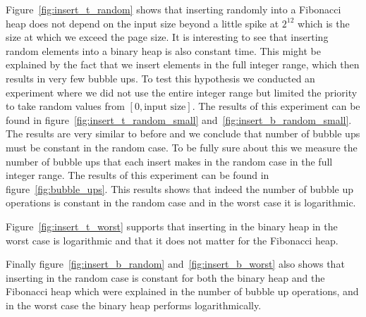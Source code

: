 \documentclass[a4paper,oneside,article,11pt]{memoir}
\begin{document}
Figure~\ref{fig:insert_t_random} shows that inserting randomly into a Fibonacci heap does not depend on the input size beyond a little spike at $2^{12}$ which is the size at which we exceed the page size. It is interesting to see that inserting random elements into a binary heap is also constant time. This might be explained by the fact that we insert elements in the full integer range, which then results in very few bubble ups. To test this hypothesis we conducted an experiment where we did not use the entire integer range but limited the priority to take random values from $\left[ 0, \text{input size} \right]$. The results of this experiment can be found in figure~\ref{fig:insert_t_random_small} and~\ref{fig:insert_b_random_small}. The results are very similar to before and we conclude that number of bubble ups must be constant in the random case. To be fully sure about this we measure the number of bubble ups that each insert makes in the random case in the full integer range. The results of this experiment can be found in figure~\ref{fig:bubble_ups}. This results shows that indeed the number of bubble up operations is constant in the random case and in the worst case it is logarithmic.

Figure~\ref{fig:insert_t_worst} supports that inserting in the binary heap in the worst case is logarithmic and that it does not matter for the Fibonacci heap.

Finally figure~\ref{fig:insert_b_random} and~\ref{fig:insert_b_worst} also shows that inserting in the random case is constant for both the binary heap and the Fibonacci heap which were explained in the number of bubble up operations, and in the worst case the binary heap performs logarithmically.
\end{document}
